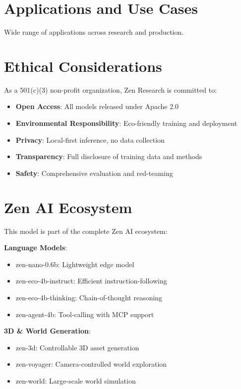 \documentclass[11pt,a4paper]{article}
\begin{document}
\section{Applications and Use Cases}

Wide range of applications across research and production.

\section{Ethical Considerations}

As a 501(c)(3) non-profit organization, Zen Research is committed to:
\begin{itemize}
    \item \textbf{Open Access}: All models released under Apache 2.0
    \item \textbf{Environmental Responsibility}: Eco-friendly training and deployment
    \item \textbf{Privacy}: Local-first inference, no data collection
    \item \textbf{Transparency}: Full disclosure of training data and methods
    \item \textbf{Safety}: Comprehensive evaluation and red-teaming
\end{itemize}

\section{Zen AI Ecosystem}

This model is part of the complete Zen AI ecosystem:

\textbf{Language Models}:
\begin{itemize}
    \item zen-nano-0.6b: Lightweight edge model
    \item zen-eco-4b-instruct: Efficient instruction-following
    \item zen-eco-4b-thinking: Chain-of-thought reasoning
    \item zen-agent-4b: Tool-calling with MCP support
\end{itemize}

\textbf{3D \& World Generation}:
\begin{itemize}
    \item zen-3d: Controllable 3D asset generation
    \item zen-voyager: Camera-controlled world exploration
    \item zen-world: Large-scale world simulation
\end{itemize}
\end{document}

